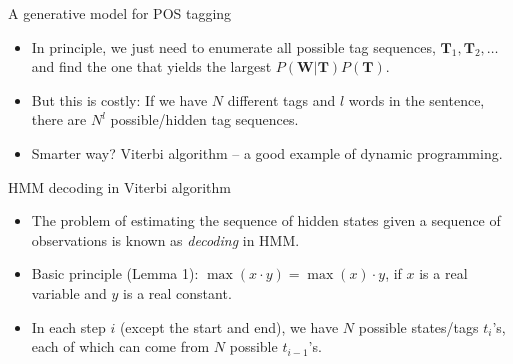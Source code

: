 \documentclass[11pt, handout]{beamer}
\begin{document}
\begin{frame}{A generative model for POS tagging}
 \begin{itemize}[<+->]
  \item In principle, we just need to enumerate all possible tag sequences, $\mathbf{T}_1, \mathbf{T}_2, \dots$ and find the one that yields the largest  $P(\mathbf{W}|\mathbf{T}) P(\mathbf{T})$.
  \item But this is costly: If we have $N$ different tags and $l$ words in the sentence, there are $N^l$ possible/hidden tag sequences. 
  \item Smarter way? Viterbi algorithm -- a good example of dynamic programming. 
 \end{itemize}
\end{frame}

\begin{frame}[shrink]{HMM decoding in Viterbi algorithm}
\begin{itemize}[<+->]
 \item The problem of estimating the sequence of hidden states given a sequence of observations is known as \emph{decoding} in HMM. 
 \item Basic principle (Lemma 1): $\max(x\cdot y) = \max(x) \cdot y$,  if $x$ is a real variable and $y$ is a real constant. 
 \item In each step $i$ (except the start and end), we have $N$ possible states/tags $t_i$'s, each of which can come from $N$ possible $t_{i-1}$'s.  
  \end{itemize} 
\end{frame}
\end{document}
